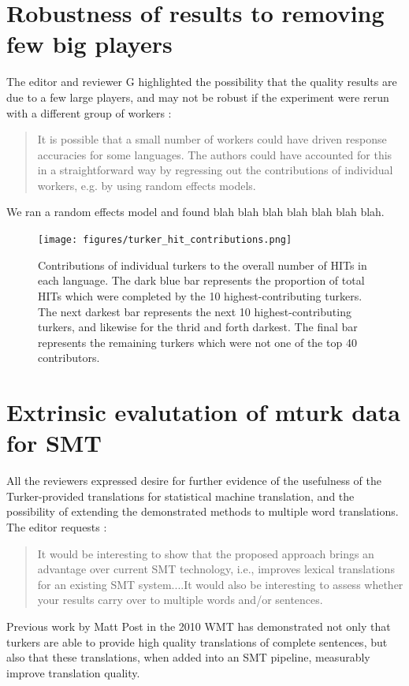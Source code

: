 \documentclass[11pt]{article}
\begin{document}
\section{Robustness of results to removing few big players}

The editor and reviewer G highlighted the possibility that the quality results are due to a few large players, and may not be robust if the experiment were rerun with a different group of workers : 
\begin{quote}
It is possible that a small number of workers could have driven response accuracies for some languages. The authors could have accounted for this in a straightforward way by regressing out the contributions of individual workers, e.g. by using random effects models.
\end{quote}
We ran a random effects model and found blah blah blah blah blah blah blah. 

\begin{figure}
\texttt{[image: figures/turker\_hit\_contributions.png]}
\caption{Contributions of individual turkers to the overall number of HITs in each language. The dark blue bar represents the proportion of total HITs which were completed by the 10 highest-contributing turkers. The next darkest bar represents the next 10 highest-contributing turkers, and likewise for the thrid and forth darkest. The final bar represents the remaining turkers which were not one of the top 40 contributors.}
\label{numhits}
\end{figure}


\section{Extrinsic evalutation of mturk data for SMT}

All the reviewers expressed desire for further evidence of the usefulness of the Turker-provided translations for statistical machine translation, and the possibility of extending the demonstrated methods to multiple word translations. The editor requests :

\begin{quote}
It would be interesting to show that the proposed approach brings an advantage over current SMT technology, i.e., improves lexical translations for an existing SMT system....It would also be interesting to assess whether your results carry over to multiple words and/or sentences. 
\end{quote}

Previous work by Matt Post in the 2010 WMT has demonstrated not only that turkers are able to provide high quality translations of complete sentences, but also that these translations, when added into an SMT pipeline, measurably improve translation quality. 
\end{document}
